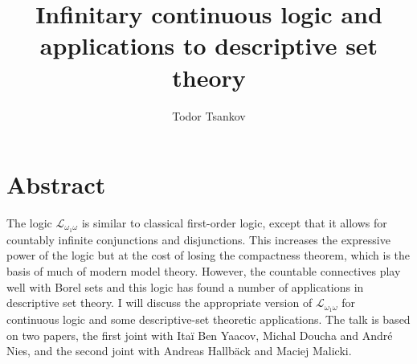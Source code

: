 \documentclass[11pt]{amsart}
\title{Infinitary continuous logic and applications to descriptive set theory}
\author{Todor Tsankov}
\begin{document}
\maketitle

\section*{Abstract}


The logic $\mathcal L_{\omega_1\omega}$ is similar to classical first-order logic, except that it allows for countably infinite conjunctions and disjunctions. This increases the expressive power of the logic but at the cost of losing the compactness theorem, which is the basis of much of modern model theory. However, the countable connectives play well with Borel sets and this logic has found a number of applications in descriptive set theory. I will discuss the appropriate version of $\mathcal L_{\omega_1\omega}$ for continuous logic and some descriptive-set theoretic applications. The talk is based on two papers, the first joint with Ita\"i Ben Yaacov, Michal Doucha and Andr\'e Nies, and the second joint with Andreas Hallb\"ack and Maciej Malicki.
\end{document}
